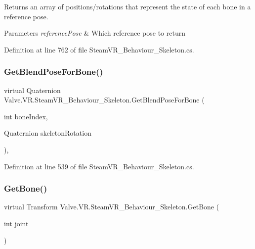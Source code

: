 Returns an array of positions/rotations that represent the state of each bone in a reference pose. 


\begin{DoxyParams}{Parameters}
{\em reference\+Pose} & Which reference pose to return\\
\hline
\end{DoxyParams}


Definition at line 762 of file Steam\+V\+R\+\_\+\+Behaviour\+\_\+\+Skeleton.\+cs.

\mbox{\label{class_valve_1_1_v_r_1_1_steam_v_r___behaviour___skeleton_a01de54e6d66537adbba7550c07f6450c}} 
\subsubsection{\texorpdfstring{GetBlendPoseForBone()}{GetBlendPoseForBone()}}
{\footnotesize\ttfamily virtual Quaternion Valve.\+V\+R.\+Steam\+V\+R\+\_\+\+Behaviour\+\_\+\+Skeleton.\+Get\+Blend\+Pose\+For\+Bone (\begin{DoxyParamCaption}\item[{int}]{bone\+Index,  }\item[{Quaternion}]{skeleton\+Rotation }\end{DoxyParamCaption})\hspace{0.3cm}{\ttfamily [protected]}, {\ttfamily [virtual]}}



Definition at line 539 of file Steam\+V\+R\+\_\+\+Behaviour\+\_\+\+Skeleton.\+cs.

\mbox{\label{class_valve_1_1_v_r_1_1_steam_v_r___behaviour___skeleton_a0d79a785e44f82950ea9d3cfa61d05b5}} 
\subsubsection{\texorpdfstring{GetBone()}{GetBone()}}
{\footnotesize\ttfamily virtual Transform Valve.\+V\+R.\+Steam\+V\+R\+\_\+\+Behaviour\+\_\+\+Skeleton.\+Get\+Bone (\begin{DoxyParamCaption}\item[{int}]{joint }\end{DoxyParamCaption})\hspace{0.3cm}{\ttfamily [virtual]}}



